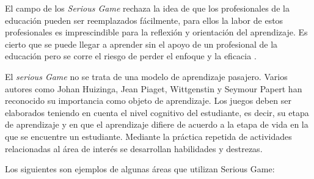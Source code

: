 El campo de los \emph{Serious Game} rechaza la idea de que los profesionales de
la educación pueden ser reemplazados fácilmente, para ellos la labor de estos
profesionales es imprescindible para la reflexión y orientación del aprendizaje.
Es cierto que se puede llegar a aprender sin el apoyo de un profesional de la
educación pero se corre el riesgo de perder el enfoque y la eficacia
\cite{elearning:seiousgames}. 

El \emph{serious Game} no se trata de una modelo de aprendizaje pasajero. Varios
autores como Johan Huizinga, Jean Piaget, Wittgenstin y Seymour Papert han
reconocido su importancia  como objeto de aprendizaje. Los juegos deben ser
elaborados teniendo en cuenta el nivel cognitivo del estudiante, es decir, su
etapa de aprendizaje y en que el aprendizaje difiere de acuerdo a la etapa de
vida en la que se encuentre un estudiante. Mediante la práctica repetida de
actividades relacionadas al área de interés se desarrollan habilidades y
destrezas\cite{education:games}. 

Los siguientes son ejemplos de algunas áreas que utilizan Serious Game:

